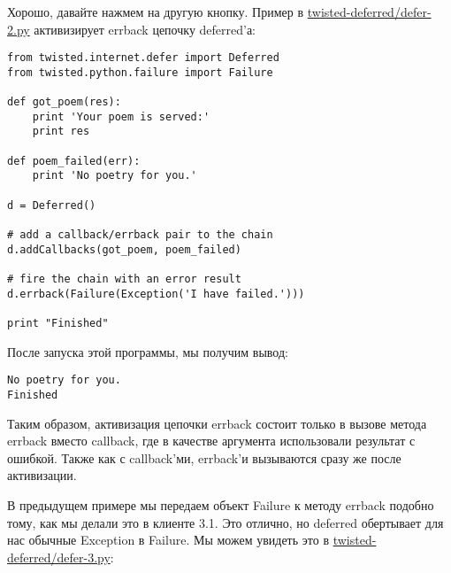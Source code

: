 Хорошо, давайте нажмем на другую кнопку. Пример в 
\href{http://github.com/jdavisp3/twisted-intro/blob/master/twisted-deferred/defer-2.py}{twisted-deferred/defer-2.py} 
активизирует errback цепочку deferred'а:

 \begin{verbatim}
from twisted.internet.defer import Deferred
from twisted.python.failure import Failure

def got_poem(res):
    print 'Your poem is served:'
    print res

def poem_failed(err):
    print 'No poetry for you.'

d = Deferred()

# add a callback/errback pair to the chain
d.addCallbacks(got_poem, poem_failed)

# fire the chain with an error result
d.errback(Failure(Exception('I have failed.')))

print "Finished"
\end{verbatim} 

После запуска этой программы, мы получим вывод:

 \begin{verbatim}
No poetry for you.
Finished
\end{verbatim} 


Таким образом, активизация цепочки errback состоит только в 
вызове метода errback вместо callback, где в качестве 
аргумента использовали результат с ошибкой. Также как с 
callback'ми, errback'и вызываются сразу же после активизации.  



В предыдущем примере мы передаем объект Failure к методу 
errback подобно тому, как мы делали это в клиенте 3.1. Это отлично, 
но deferred обертывает для нас обычные Exception в Failure. Мы 
можем увидеть это в 
\href{http://github.com/jdavisp3/twisted-intro/blob/master/twisted-deferred/defer-3.py}{twisted-deferred/defer-3.py}:

